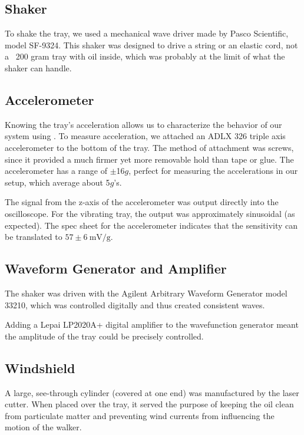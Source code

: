 \subsection{Shaker}
    To shake the tray, we used a mechanical wave driver made by Pasco Scientific, model SF-9324. This shaker was designed to drive a string or an elastic cord, not a ~200 gram tray with oil inside, which was probably at the limit of what the shaker can handle. 
            
\subsection{Accelerometer}  
    Knowing the tray's acceleration allows us to characterize the behavior of our system using . To measure acceleration, we attached an ADLX 326 triple axis accelerometer to the bottom of the tray. The method of attachment was screws, since it provided a much firmer yet more removable hold than tape or glue. The accelerometer has a range of $\pm$16$g$, perfect for measuring the accelerations in our setup, which average about 5$g$'s. 
      
      The signal from the z-axis of the accelerometer was output directly into the oscilloscope. For the vibrating tray, the output was approximately sinusoidal (as expected). The spec sheet for the accelerometer indicates that the sensitivity can be translated to $57 \pm 6~\mathrm{mV/g}$. 

\subsection{Waveform Generator and Amplifier}
    The shaker was driven with the Agilent Arbitrary Waveform Generator model 33210, which was controlled digitally and thus created consistent waves.  
       
    Adding a Lepai LP2020A+ digital amplifier to the wavefunction generator meant the amplitude of the tray could be precisely controlled.   
    
\subsection{Windshield}
    A large, see-through cylinder (covered at one end) was manufactured by the laser cutter. When placed over the tray, it served the purpose of keeping the oil clean from particulate matter and preventing wind currents from influencing the motion of the walker.       
   
